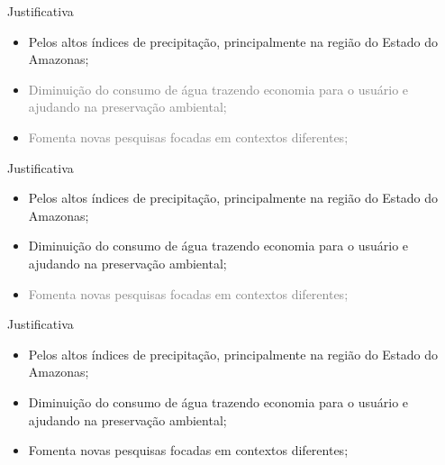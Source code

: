 \begin{frame}{Justificativa}
  \begin{itemize}
    \item {Pelos altos índices de precipitação, principalmente na região do Estado do Amazonas;}
    \item \textcolor{gray}{Diminuição do consumo de água trazendo economia para o usuário e ajudando na preservação ambiental;}
    \item  \textcolor{gray}{Fomenta novas pesquisas focadas em contextos diferentes;}
  \end{itemize}
\end{frame}

\begin{frame}{Justificativa}
  \begin{itemize}
    \item {Pelos altos índices de precipitação, principalmente na região do Estado do Amazonas;}
    \item {Diminuição do consumo de água trazendo economia para o usuário e ajudando na preservação ambiental;}
    \item  \textcolor{gray}{Fomenta novas pesquisas focadas em contextos diferentes;}
  \end{itemize}
\end{frame}

\begin{frame}{Justificativa}
  \begin{itemize}
    \item {Pelos altos índices de precipitação, principalmente na região do Estado do Amazonas;}
    \item {Diminuição do consumo de água trazendo economia para o usuário e ajudando na preservação ambiental;}
    \item  {Fomenta novas pesquisas focadas em contextos diferentes;}
  \end{itemize}
\end{frame}